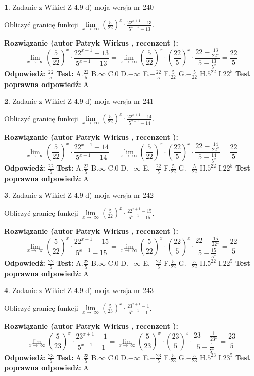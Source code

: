 \documentclass[12pt, a4paper]{article}
\theoremstyle{definition} %
\newtheorem{zad}{}
\newcommand{\zadStart}[1]{\begin{zad}#1\newline}
\newcommand{\zadStop}{\end{zad}}
\newcommand{\rozwStart}[2]{\noindent \textbf{Rozwiązanie (autor #1 , recenzent #2): }\newline}
\newcommand{\rozwStop}{\newline}
\newcommand{\odpStart}{\noindent \textbf{Odpowiedź:}\newline}
\newcommand{\odpStop}{\newline}
\newcommand{\testStart}{\noindent \textbf{Test:}\newline}
\newcommand{\testStop}{\newline}
\newcommand{\kluczStart}{\noindent \textbf{Test poprawna odpowiedź:}\newline}
\newcommand{\kluczStop}{\newline}
\begin{document}
\zadStart{Zadanie z Wikieł Z 4.9 d) moja wersja nr 240}


Obliczyć granicę funkcji  $\lim\limits_{x\to\ \infty}(\frac{5}{22})^{x}\cdot\frac{22^{x+1}-13}{5^{x+1}-13}$.
\zadStop
\rozwStart{Patryk Wirkus}{}
$$\lim\limits_{x\to\ \infty}(\frac{5}{22})^{x}\cdot\frac{22^{x+1}-13}{5^{x+1}-13}=\lim\limits_{x\to\ \infty}(\frac{5}{22})^{x}\cdot(\frac{22}{5})^{x} \cdot \frac{22-\frac{13}{22^{x}}}{5-\frac{13}{5^{x}}} = \frac{22}{5}$$
\rozwStop
\odpStart
$\frac{22}{5}$
\odpStop
\testStart
A.$\frac{22}{5}$ B.$\infty$ C.$0$ D.$-\infty$ E.$-\frac{22}{5}$
F.$\frac{5}{22}$ G.$-\frac{5}{22}$
H.$5^{22}$
I.$22^{5}$
\testStop
\kluczStart
A
\kluczStop



\zadStart{Zadanie z Wikieł Z 4.9 d) moja wersja nr 241}


Obliczyć granicę funkcji  $\lim\limits_{x\to\ \infty}(\frac{5}{22})^{x}\cdot\frac{22^{x+1}-14}{5^{x+1}-14}$.
\zadStop
\rozwStart{Patryk Wirkus}{}
$$\lim\limits_{x\to\ \infty}(\frac{5}{22})^{x}\cdot\frac{22^{x+1}-14}{5^{x+1}-14}=\lim\limits_{x\to\ \infty}(\frac{5}{22})^{x}\cdot(\frac{22}{5})^{x} \cdot \frac{22-\frac{14}{22^{x}}}{5-\frac{14}{5^{x}}} = \frac{22}{5}$$
\rozwStop
\odpStart
$\frac{22}{5}$
\odpStop
\testStart
A.$\frac{22}{5}$ B.$\infty$ C.$0$ D.$-\infty$ E.$-\frac{22}{5}$
F.$\frac{5}{22}$ G.$-\frac{5}{22}$
H.$5^{22}$
I.$22^{5}$
\testStop
\kluczStart
A
\kluczStop



\zadStart{Zadanie z Wikieł Z 4.9 d) moja wersja nr 242}


Obliczyć granicę funkcji  $\lim\limits_{x\to\ \infty}(\frac{5}{22})^{x}\cdot\frac{22^{x+1}-15}{5^{x+1}-15}$.
\zadStop
\rozwStart{Patryk Wirkus}{}
$$\lim\limits_{x\to\ \infty}(\frac{5}{22})^{x}\cdot\frac{22^{x+1}-15}{5^{x+1}-15}=\lim\limits_{x\to\ \infty}(\frac{5}{22})^{x}\cdot(\frac{22}{5})^{x} \cdot \frac{22-\frac{15}{22^{x}}}{5-\frac{15}{5^{x}}} = \frac{22}{5}$$
\rozwStop
\odpStart
$\frac{22}{5}$
\odpStop
\testStart
A.$\frac{22}{5}$ B.$\infty$ C.$0$ D.$-\infty$ E.$-\frac{22}{5}$
F.$\frac{5}{22}$ G.$-\frac{5}{22}$
H.$5^{22}$
I.$22^{5}$
\testStop
\kluczStart
A
\kluczStop



\zadStart{Zadanie z Wikieł Z 4.9 d) moja wersja nr 243}


Obliczyć granicę funkcji  $\lim\limits_{x\to\ \infty}(\frac{5}{23})^{x}\cdot\frac{23^{x+1}-1}{5^{x+1}-1}$.
\zadStop
\rozwStart{Patryk Wirkus}{}
$$\lim\limits_{x\to\ \infty}(\frac{5}{23})^{x}\cdot\frac{23^{x+1}-1}{5^{x+1}-1}=\lim\limits_{x\to\ \infty}(\frac{5}{23})^{x}\cdot(\frac{23}{5})^{x} \cdot \frac{23-\frac{1}{23^{x}}}{5-\frac{1}{5^{x}}} = \frac{23}{5}$$
\rozwStop
\odpStart
$\frac{23}{5}$
\odpStop
\testStart
A.$\frac{23}{5}$ B.$\infty$ C.$0$ D.$-\infty$ E.$-\frac{23}{5}$
F.$\frac{5}{23}$ G.$-\frac{5}{23}$
H.$5^{23}$
I.$23^{5}$
\testStop
\kluczStart
A
\kluczStop
\end{document}
